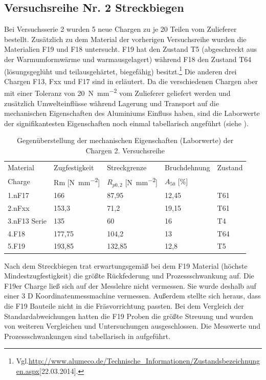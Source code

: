 \documentclass[12pt,a4paper,parskip]{scrartcl}
\begin{document}
\subsection{Versuchsreihe Nr. 2 Streckbiegen}
Bei Versuchsserie 2 wurden 5 neue Chargen zu je 20 Teilen vom Zulieferer bestellt. Zusätzlich zu dem Material der vorherigen Versuchsreihe wurden die Materialien F19 und F18 untersucht. F19 hat den Zustand T5 (abgeschreckt aus der Warmumformwärme und warmausgelagert) während F18 den Zustand T64 (lösungsgeglüht und teilausgehärtet, biegefähig) besitzt.\footnote{Vgl.\url{http://www.alumeco.de/Technische_Informationen/Zustandsbezeichnungen.aspx}[22.03.2014].}  Die anderen drei Chargen F13, Fxx und F17 sind in  erläutert. Da die verschiedenen Chargen aber mit einer Toleranz von \SI{20}{\newton\per\milli\meter\squared} vom Zulieferer geliefert werden und zusätzlich Umwelteinflüsse während Lagerung und Transport auf die mechanischen Eigenschaften des Aluminiums Einfluss haben,  sind die Laborwerte der signifikantesten Eigenschaften noch einmal tabellarisch angeführt (siehe ).\\
\begin{table}[hbtp]
\caption{Gegenüberstellung der mechanischen Eigenschaften (Laborwerte) der Chargen 2. Versuchsreihe}
\label{tab:eigenschaften2}
\centering
\begin{tabular}{lllll}
\toprule
Material & Zugfestigkeit & Streckgrenze & Bruchdehnung & Zustand \\
Charge &  Rm [\si{\newton\per\milli\meter\squared}] &  $R_{p0,2}$ [\si{\newton\per\milli\meter\squared}] &  $A_{50}$ [\%] & \\
\midrule
1.nF17 & 166 & 87,95 & 12,45 & T61 \\
2.nFxx & 153,3 & 71,2 &  19,15 & T61 \\
3.nF13 Serie & 135 & 60 & 16  & T4 \\
4.F18 & 177,75 & 104,2 & 13 & T64 \\
5.F19 & 193,85 & 132,85 & 12,8 &  T5 \\

\bottomrule




\end{tabular}
\end{table}

 
Nach dem Streckbiegen trat erwartungsgemäß bei dem F19 Material (höchste Mindestzugfestigkeit) die größte Rückfederung und Prozessschwankung auf. Die F19er Charge ließ sich auf der Messlehre nicht vermessen. Sie wurde deshalb auf einer 3 D Koordinatenmessmachine vermessen.  Außerdem stellte sich heraus, dass die F19 Bauteile nicht in die Fräsvorrichtung passten. Bei dem Vergleich der Standardabweichungen hatten die  F19 Proben  die größte Streuung und wurden von weiteren Vergleichen und Untersuchungen ausgeschlossen. Die Messwerte und Prozessschwankungen sind tabellarisch in  aufgeführt.
\end{document}
